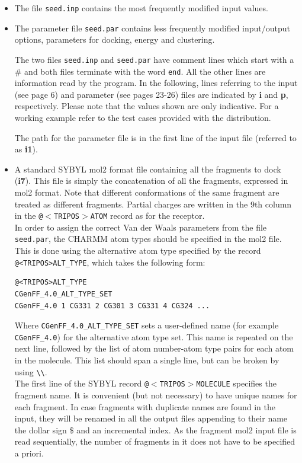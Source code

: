 \documentclass[a4paper,12pt,titlepage]{article}
\begin{document}
\begin{itemize}

\item
The file {\tt seed.inp} contains the most frequently modified input values.

\item
The parameter file {\tt seed.par} contains less frequently modified input/output options, parameters for docking, energy and clustering.

The two files {\tt seed.inp} and {\tt seed.par} have comment lines which start with a \# and both files 
terminate with the word {\tt end}. All the other lines are information read by the program. In the following, 
lines referring to the input (see page 6) and parameter 
(see pages 23-26) files are indicated by {\bf i} and {\bf p}, respectively. Please note that the values shown are only indicative. For a working example refer to the test cases provided with the distribution.

The path for the parameter file is in the first line of the input file (referred to as {\bf i1}).

\item
A standard SYBYL mol2 format file containing all the fragments to dock (\textbf{i7}).
This file is simply the concatenation of all the fragments, expressed in mol2 format. Note that different conformations of the same fragment are treated as different fragments.
Partial charges are written in the 9th column in the \texttt{@$<$TRIPOS$>$ATOM} record as for the receptor.\\
In order to assign the correct Van der Waals parameters from the file \texttt{seed.par}, the CHARMM atom types should be specified in the mol2 file. This is done using the alternative atom type specified by the record \texttt{@<TRIPOS>ALT\_TYPE}, which takes the following form:
\begin{verbatim}
@<TRIPOS>ALT_TYPE
CGenFF_4.0_ALT_TYPE_SET
CGenFF_4.0 1 CG331 2 CG301 3 CG331 4 CG324 ...
\end{verbatim}
Where \texttt{CGenFF\_4.0\_ALT\_TYPE\_SET} sets a user-defined name (for example \texttt{CGenFF\_4.0}) for the alternative atom type set. This name is repeated on the next line, followed by the list of atom number-atom type pairs for each atom in the molecule. This list should span a single line, but can be broken by using \texttt{\textbackslash\textbackslash}.\\
The first line of the SYBYL record \texttt{@$<$TRIPOS$>$MOLECULE} specifies the fragment name. It is convenient (but not necessary) to have unique names for each fragment. In case fragments with duplicate names are found in the input, they will be renamed in all the output files appending to their name the dollar sign \$ and an incremental index.
As the fragment mol2 input file is read sequentially, the number of fragments in it does not have to be specified a priori.


\end{itemize}
\end{document}
